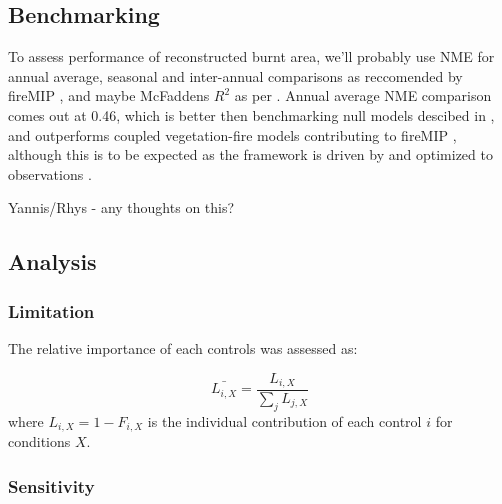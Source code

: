 \subsection{Benchmarking}
\begin{shaded}
To assess performance of reconstructed burnt area, we'll probably use NME for annual average, seasonal and inter-annual comparisons \citep{kelley2013comprehensive} as reccomended by fireMIP \citet{gmd-2016-237, hantson2016status}, and maybe McFaddens $R^{2}$ as per \citep{bistinas2014causal}. Annual average NME comparison comes out at 0.46, which is better then benchmarking null models descibed in \citet{kelley2013comprehensive}, and outperforms coupled vegetation-fire models contributing to fireMIP \citep{hantson2016status}, although this is to be expected as the framework is driven by and optimized to observations \citep{kelley2013comprehensive}.

Yannis/Rhys - any thoughts on this?
\end{shaded}
\subsection{Analysis}


\subsubsection{Limitation}

The relative importance of each controls was assessed as:

\begin{equation}
    \bar{L_{i, X}} = \frac{L_{i, X}}{\sum_{j} L_{j, X}}
\end{equation}
where $L_{i, X} = 1 - F_{i,X}$ is the individual contribution of each control $i$ for conditions $X$.

\subsubsection{Sensitivity}



